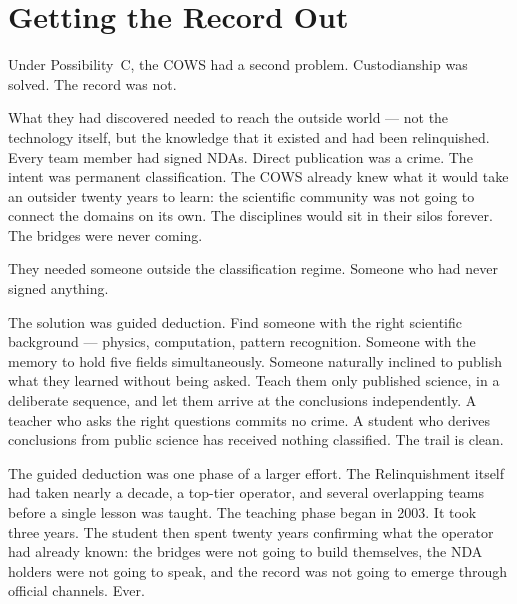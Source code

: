 
\section*{Getting the Record Out}
\label{spine:wr-getting-the-record-out}


Under Possibility~C, the COWS had a second problem. Custodianship was solved. The record was not.

What they had discovered needed to reach the outside world --- not the technology itself, but the knowledge that it existed and had been relinquished. Every team member had signed NDAs. Direct publication was a crime. The intent was permanent classification. The COWS already knew what it would take an outsider twenty years to learn: the scientific community was not going to connect the domains on its own. The disciplines would sit in their silos forever. The bridges were never coming.

They needed someone outside the classification regime. Someone who had never signed anything.

The solution was guided deduction. Find someone with the right scientific background --- physics, computation, pattern recognition. Someone with the memory to hold five fields simultaneously. Someone naturally inclined to publish what they learned without being asked. Teach them only published science, in a deliberate sequence, and let them arrive at the conclusions independently. A teacher who asks the right questions commits no crime. A student who derives conclusions from public science has received nothing classified. The trail is clean.

The guided deduction was one phase of a larger effort. The Relinquishment itself had taken nearly a decade, a top-tier operator, and several overlapping teams before a single lesson was taught. The teaching phase began in 2003. It took three years. The student then spent twenty years confirming what the operator had already known: the bridges were not going to build themselves, the NDA holders were not going to speak, and the record was not going to emerge through official channels. Ever.

